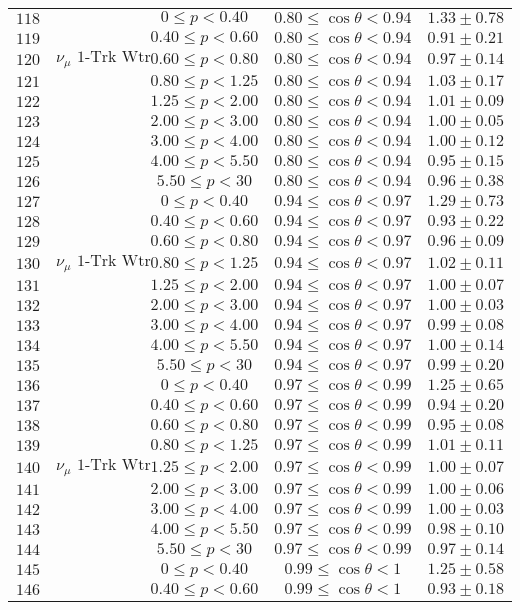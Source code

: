 \begin{longtable}[c]{ccccc}
$118$ &  & $0\leq p<0.40$ & $0.80\leq\cos\theta<0.94$ & $1.33\pm0.78$\tabularnewline
$119$ &  & $0.40\leq p<0.60$ & $0.80\leq\cos\theta<0.94$ & $0.91\pm0.21$\tabularnewline
$120$ & $\nu_{\mu}\text{ 1-Trk Wtr }$ & $0.60\leq p<0.80$ & $0.80\leq\cos\theta<0.94$ & $0.97\pm0.14$\tabularnewline
$121$ &  & $0.80\leq p<1.25$ & $0.80\leq\cos\theta<0.94$ & $1.03\pm0.17$\tabularnewline
$122$ &  & $1.25\leq p<2.00$ & $0.80\leq\cos\theta<0.94$ & $1.01\pm0.09$\tabularnewline
$123$ &  & $2.00\leq p<3.00$ & $0.80\leq\cos\theta<0.94$ & $1.00\pm0.05$\tabularnewline
$124$ &  & $3.00\leq p<4.00$ & $0.80\leq\cos\theta<0.94$ & $1.00\pm0.12$\tabularnewline
$125$ &  & $4.00\leq p<5.50$ & $0.80\leq\cos\theta<0.94$ & $0.95\pm0.15$\tabularnewline
$126$ &  & $5.50\leq p<30$ & $0.80\leq\cos\theta<0.94$ & $0.96\pm0.38$\tabularnewline
$127$ &  & $0\leq p<0.40$ & $0.94\leq\cos\theta<0.97$ & $1.29\pm0.73$\tabularnewline
$128$ &  & $0.40\leq p<0.60$ & $0.94\leq\cos\theta<0.97$ & $0.93\pm0.22$\tabularnewline
$129$ &  & $0.60\leq p<0.80$ & $0.94\leq\cos\theta<0.97$ & $0.96\pm0.09$\tabularnewline
$130$ & $\nu_{\mu}\text{ 1-Trk Wtr }$ & $0.80\leq p<1.25$ & $0.94\leq\cos\theta<0.97$ & $1.02\pm0.11$\tabularnewline
$131$ &  & $1.25\leq p<2.00$ & $0.94\leq\cos\theta<0.97$ & $1.00\pm0.07$\tabularnewline
$132$ &  & $2.00\leq p<3.00$ & $0.94\leq\cos\theta<0.97$ & $1.00\pm0.03$\tabularnewline
$133$ &  & $3.00\leq p<4.00$ & $0.94\leq\cos\theta<0.97$ & $0.99\pm0.08$\tabularnewline
$134$ &  & $4.00\leq p<5.50$ & $0.94\leq\cos\theta<0.97$ & $1.00\pm0.14$\tabularnewline
$135$ &  & $5.50\leq p<30$ & $0.94\leq\cos\theta<0.97$ & $0.99\pm0.20$\tabularnewline
$136$ &  & $0\leq p<0.40$ & $0.97\leq\cos\theta<0.99$ & $1.25\pm0.65$\tabularnewline
$137$ &  & $0.40\leq p<0.60$ & $0.97\leq\cos\theta<0.99$ & $0.94\pm0.20$\tabularnewline
$138$ &  & $0.60\leq p<0.80$ & $0.97\leq\cos\theta<0.99$ & $0.95\pm0.08$\tabularnewline
$139$ &  & $0.80\leq p<1.25$ & $0.97\leq\cos\theta<0.99$ & $1.01\pm0.11$\tabularnewline
$140$ & $\nu_{\mu}\text{ 1-Trk Wtr }$ & $1.25\leq p<2.00$ & $0.97\leq\cos\theta<0.99$ & $1.00\pm0.07$\tabularnewline
$141$ &  & $2.00\leq p<3.00$ & $0.97\leq\cos\theta<0.99$ & $1.00\pm0.06$\tabularnewline
$142$ &  & $3.00\leq p<4.00$ & $0.97\leq\cos\theta<0.99$ & $1.00\pm0.03$\tabularnewline
$143$ &  & $4.00\leq p<5.50$ & $0.97\leq\cos\theta<0.99$ & $0.98\pm0.10$\tabularnewline
$144$ &  & $5.50\leq p<30$ & $0.97\leq\cos\theta<0.99$ & $0.97\pm0.14$\tabularnewline
$145$ &  & $0\leq p<0.40$ & $0.99\leq\cos\theta<1$ & $1.25\pm0.58$\tabularnewline
$146$ &  & $0.40\leq p<0.60$ & $0.99\leq\cos\theta<1$ & $0.93\pm0.18$\tabularnewline

\end{longtable}

